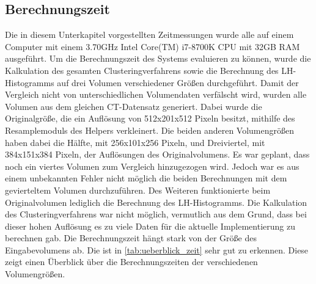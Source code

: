 \subsection{Berechnungszeit}

Die in diesem Unterkapitel vorgestellten Zeitmessungen wurde alle auf einem Computer mit einem 3.70GHz  Intel Core(TM) i7-8700K CPU mit 32GB RAM ausgeführt.
Um die Berechnungszeit des Systems evaluieren zu können, wurde die Kalkulation des gesamten Clusteringverfahrens sowie die Berechnung des LH-Histogramms auf drei Volumen verschiedener Größen durchgeführt. Damit der Vergleich nicht von unterschiedlichen Volumendaten verfälscht wird, wurden alle Volumen aus dem gleichen CT-Datensatz generiert.
\newline
Dabei wurde die Originalgröße, die ein Auflösung von 512x201x512 Pixeln besitzt, mithilfe des Resamplemoduls des Helpers verkleinert. Die beiden anderen Volumengrößen haben dabei die  Hälfte, mit 256x101x256 Pixeln, und Dreiviertel, mit 384x151x384 Pixeln, der Auflösungen des Originalvolumens.
Es war geplant, dass noch ein viertes Volumen zum Vergleich hinzugezogen wird. Jedoch war es aus einem unbekannten Fehler nicht möglich die beiden Berechnungen mit dem gevierteltem Volumen durchzuführen.
Des Weiteren funktionierte beim Originalvolumen lediglich die Berechnung des LH-Histogramms. Die Kalkulation des Clusteringverfahrens war nicht möglich, vermutlich aus dem Grund, dass bei dieser hohen Auflösung es zu viele Daten für die aktuelle Implementierung zu berechnen gab.
Die Berechnungszeit hängt stark von der Größe des Eingabevolumens ab. Die ist in \autoref{tab:ueberblick_zeit} sehr gut zu erkennen. Diese zeigt einen Überblick über die  Berechnungszeiten der verschiedenen Volumengrößen.


\begin{table}[h]
\centering
{}
\caption{Überblick über die Berechnungszeiten der verschiedenen Volumengrößen}
\label{tab:ueberblick_zeit}
\end{table}


